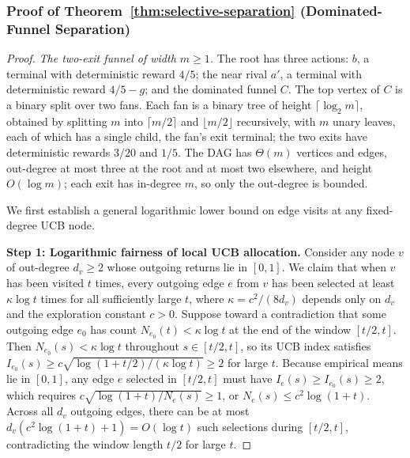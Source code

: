 \documentclass{article}
\theoremstyle{plain}
\theoremstyle{definition}
\begin{document}
\subsubsection{Proof of Theorem~\ref{thm:selective-separation} (Dominated-Funnel Separation)}

\begin{proof}
\emph{The two-exit funnel of width $m\ge1$.} The root has three
actions: $b$, a terminal with deterministic reward $4/5$; the near
rival $a'$, a terminal with deterministic reward $4/5-g$; and the
dominated funnel $C$. The top vertex of $C$ is a binary split over two
fans. Each fan is a binary tree of height $\lceil\log_2m\rceil$,
obtained by splitting $m$ into $\lceil m/2\rceil$ and $\lfloor m/2\rfloor$
recursively, with $m$ unary leaves, each of which has a single child,
the fan's exit terminal; the two exits have deterministic rewards $3/20$
and $1/5$. The DAG has $\Theta(m)$ vertices and edges, out-degree at
most three at the root and at most two elsewhere, and height
$O(\log m)$; each exit has in-degree $m$, so only the out-degree is
bounded.

We first establish a general logarithmic lower bound on edge visits at any fixed-degree UCB node.

\medskip\noindent\textbf{Step 1: Logarithmic fairness of local UCB allocation.}
Consider any node $v$ of out-degree $d_v \ge 2$ whose outgoing returns lie in $[0,1]$. We claim that when $v$ has been visited $t$ times, every outgoing edge $e$ from $v$ has been selected at least $\kappa \log t$ times for all sufficiently large $t$, where $\kappa = c^2 / (8 d_v)$ depends only on $d_v$ and the exploration constant $c > 0$. Suppose toward a contradiction that some outgoing edge $e_0$ has count $N_{e_0}(t) < \kappa \log t$ at the end of the window $[t/2, t]$. Then $N_{e_0}(s) < \kappa \log t$ throughout $s \in [t/2, t]$, so its UCB index satisfies $I_{e_0}(s) \ge c\sqrt{\log(1 + t/2) / (\kappa \log t)} \ge 2$ for large $t$. Because empirical means lie in $[0,1]$, any edge $e$ selected in $[t/2, t]$ must have $I_e(s) \ge I_{e_0}(s) \ge 2$, which requires $c\sqrt{\log(1+t)/N_e(s)} \ge 1$, or $N_e(s) \le c^2 \log(1+t)$. Across all $d_v$ outgoing edges, there can be at most $d_v (c^2 \log(1+t) + 1) = O(\log t)$ such selections during $[t/2, t]$, contradicting the window length $t/2$ for large $t$.


\end{proof}
\end{document}
